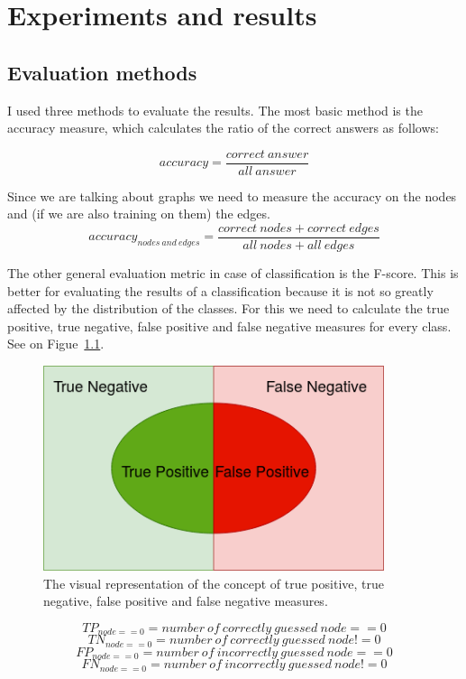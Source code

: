 \chapter{Experiments and results}\label{sect:Experiments}
\section{Evaluation methods}

I used three methods to evaluate the results. The most basic method is the accuracy measure, which calculates the ratio of the correct answers as follows:

\[accuracy = \frac{correct\ answer}{all\ answer}\]

Since we are talking about graphs we need to measure the accuracy on the nodes and (if we are also training on them) the edges.
\[accuracy_{nodes\ and\ edges} = \frac{correct\ nodes + correct\ edges}{all\ nodes + all\ edges}\]

The other general evaluation metric in case of classification is the F-score. This is better for evaluating the results of a classification because it is not so greatly affected by the distribution of the classes. For this we need to calculate the true positive, true negative, false positive and false negative measures for every class. See on Figue~\ref{fig:TP_TN_FP_FN}.

\begin{figure}[!ht]
	\centering
	\includegraphics[width=100mm, keepaspectratio]{figures/F_score.png}
	\caption{The visual representation of the concept of true positive, true negative, false positive and false negative measures.}
	\label{fig:TP_TN_FP_FN}
\end{figure}


\[TP_{node==0} = number\ of\ correctly\ guessed\ node==0\]
\[TN_{node==0} = number\ of\ correctly\ guessed\ node!=0\]
\[FP_{node==0} = number\ of\ incorrectly\ guessed\ node==0\]
\[FN_{node==0} = number\ of\ incorrectly\ guessed\ node!=0\]

